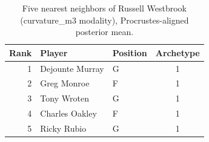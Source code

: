 \begin{table}[htbp]
  \centering\small
  \begin{tabular}{rllc}
    \toprule
    Rank & Player & Position & Archetype \\
    \midrule
    1 & Dejounte Murray & G & 1 \\
    2 & Greg Monroe & F & 1 \\
    3 & Tony Wroten & G & 1 \\
    4 & Charles Oakley & F & 1 \\
    5 & Ricky Rubio & G & 1 \\
    \bottomrule
  \end{tabular}
  \caption{Five nearest neighbors of Russell Westbrook (curvature_m3 modality), Procrustes-aligned posterior mean.}
  \label{tab:Russell_Westbrook_neighbors_curvature_m3}
\end{table}

